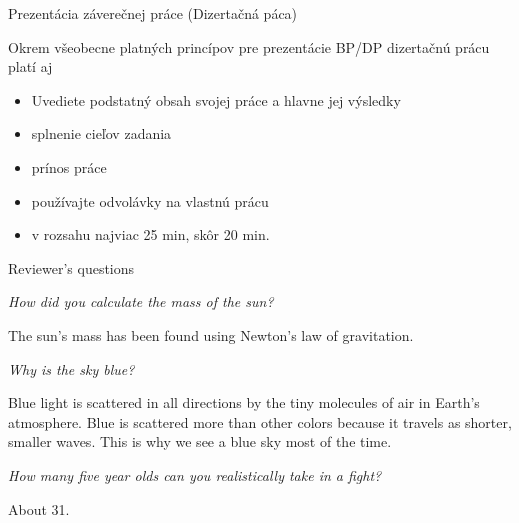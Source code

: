 \documentclass{beamer}
\begin{document}
\begin{frame}{Prezentácia záverečnej práce (Dizertačná páca)}

Okrem všeobecne platných princípov pre prezentácie BP/DP dizertačnú prácu platí aj

\begin{itemize}
 \item Uvediete podstatný obsah svojej práce a hlavne jej výsledky
 \item splnenie cieľov zadania
 \item prínos práce
 \item používajte odvolávky na vlastnú prácu
 \item v rozsahu najviac 25 min, skôr 20 min.
\end{itemize}
\end{frame}




\reviewbegin                                 %
\begin{frame}{Reviewer's questions} %

{\it How did you calculate the mass of the sun?}

The sun's mass has been found using Newton's law of gravitation.

\framebreak

{\it Why is the sky blue?}

Blue light is scattered in all directions by the tiny molecules of air in Earth's atmosphere. Blue is scattered more than other colors because it travels as shorter, smaller waves. This is why we see a blue sky most of the time.

\framebreak

{\it How many five year olds can you realistically take in a fight?}

About 31.

\end{frame}
\reviewend                                  %

\end{document}
